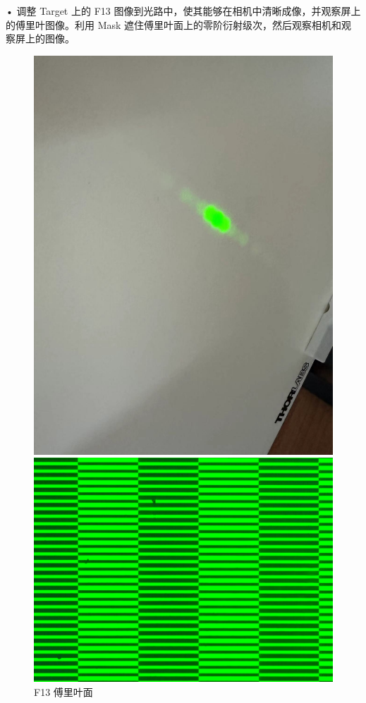 \documentclass{ctexart}
\begin{document}
• 调整 Target 上的 F13 图像到光路中，使其能够在相机中清晰成像，并观察屏上的傅里叶图像。利用 Mask 遮住傅里叶面上的零阶衍射级次，然后观察相机和观察屏上的图像。
\begin{figure}[H]
  \centering
  \begin{minipage}[b]{0.2\textwidth}
    \centering
    \includegraphics[width=\textwidth]{pictures/微信图片_20241010201057.jpg}
    \caption{F13 傅里叶面}
  \end{minipage}
  \hspace{0.05\textwidth} %
  \begin{minipage}[b]{0.2\textwidth}
    \centering
    \includegraphics[width=\textwidth]{pictures/F13-nomask-Ex24.png}

\end{minipage}
\end{figure}
\end{document}
